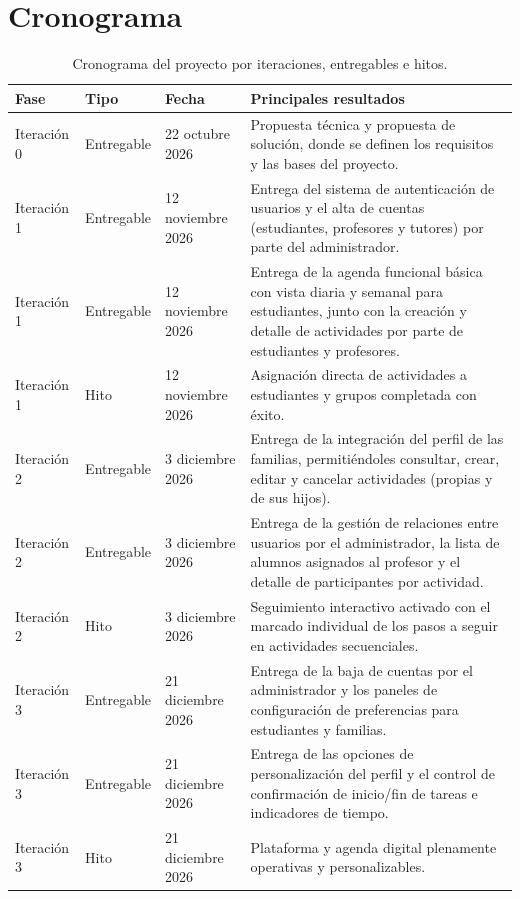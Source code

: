\section{Cronograma}

\begin{table}[H]
\centering
\small
\begin{tabularx}{\textwidth}{l l l X}
\toprule
\textbf{Fase} & \textbf{Tipo} & \textbf{Fecha} & \textbf{Principales resultados} \\
\midrule
Iteración 0 & Entregable & 22 octubre 2026 & Propuesta técnica y propuesta de solución, donde se definen los requisitos y las bases del proyecto. \\
\midrule
Iteración 1 & Entregable & 12 noviembre 2026 & Entrega del sistema de autenticación de usuarios y el alta de cuentas (estudiantes, profesores y tutores) por parte del administrador. \\
Iteración 1 & Entregable & 12 noviembre 2026 & Entrega de la agenda funcional básica con vista diaria y semanal para estudiantes, junto con la creación y detalle de actividades por parte de estudiantes y profesores. \\
Iteración 1 & Hito & 12 noviembre 2026 & Asignación directa de actividades a estudiantes y grupos completada con éxito. \\
\midrule
Iteración 2 & Entregable & 3 diciembre 2026 & Entrega de la integración del perfil de las familias, permitiéndoles consultar, crear, editar y cancelar actividades (propias y de sus hijos). \\
Iteración 2 & Entregable & 3 diciembre 2026 & Entrega de la gestión de relaciones entre usuarios por el administrador, la lista de alumnos asignados al profesor y el detalle de participantes por actividad. \\
Iteración 2 & Hito & 3 diciembre 2026 & Seguimiento interactivo activado con el marcado individual de los pasos a seguir en actividades secuenciales. \\
\midrule
Iteración 3 & Entregable & 21 diciembre 2026 & Entrega de la baja de cuentas por el administrador y los paneles de configuración de preferencias para estudiantes y familias. \\
Iteración 3 & Entregable & 21 diciembre 2026 & Entrega de las opciones de personalización del perfil y el control de confirmación de inicio/fin de tareas e indicadores de tiempo. \\
Iteración 3 & Hito & 21 diciembre 2026 & Plataforma y agenda digital plenamente operativas y personalizables. \\
\bottomrule
\end{tabularx}
\caption{Cronograma del proyecto por iteraciones, entregables e hitos.}
\label{tab:cronograma}
\end{table}